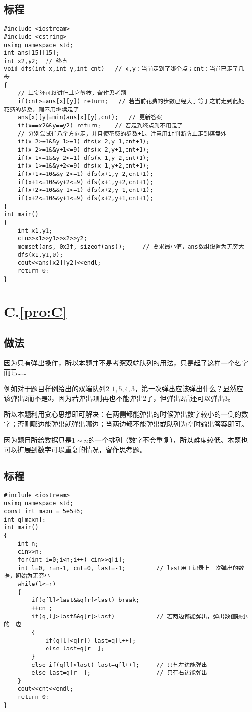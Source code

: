 \documentclass[
	lang=cn,
	color=blue
]{elegantbook}
\newcommand{\solutionheader}[1]{
	\chapter*{#1.\quad \ref*{pro:#1}}
	\addcontentsline{toc}{chapter}{A.\ref*{pro:#1}}
}
\begin{document}
\section*{标程}
\begin{lstlisting}
#include <iostream>
#include <cstring>
using namespace std;
int ans[15][15];
int x2,y2;  // 终点
void dfs(int x,int y,int cnt)   // x,y：当前走到了哪个点；cnt：当前已走了几步
{
    // 其实还可以进行其它剪枝，留作思考题
    if(cnt>=ans[x][y]) return;   // 若当前花费的步数已经大于等于之前走到此处花费的步数，则不用继续走了
    ans[x][y]=min(ans[x][y],cnt);   // 更新答案
    if(x==x2&&y==y2) return;    // 若走到终点则不用走了
    // 分别尝试往八个方向走，并且使花费的步数+1。注意用if判断防止走到棋盘外
    if(x-2>=1&&y-1>=1) dfs(x-2,y-1,cnt+1);
    if(x-2>=1&&y+1<=9) dfs(x-2,y+1,cnt+1);
    if(x-1>=1&&y-2>=1) dfs(x-1,y-2,cnt+1);
    if(x-1>=1&&y+2<=9) dfs(x-1,y+2,cnt+1);
    if(x+1<=10&&y-2>=1) dfs(x+1,y-2,cnt+1);
    if(x+1<=10&&y+2<=9) dfs(x+1,y+2,cnt+1);
    if(x+2<=10&&y-1>=1) dfs(x+2,y-1,cnt+1);
    if(x+2<=10&&y+1<=9) dfs(x+2,y+1,cnt+1);
}
int main()
{
    int x1,y1;
    cin>>x1>>y1>>x2>>y2;
    memset(ans, 0x3f, sizeof(ans));     // 要求最小值，ans数组设置为无穷大
    dfs(x1,y1,0);
    cout<<ans[x2][y2]<<endl;
    return 0;
}
\end{lstlisting}

\solutionheader{C}
\section*{做法}
因为只有弹出操作，所以本题并不是考察双端队列的用法，只是起了这样一个名字而已……

例如对于题目样例给出的双端队列$2,1,5,4,3$，第一次弹出应该弹出什么？显然应该弹出$2$而不是$3$，因为若弹出3则再也不能弹出$2$了，但弹出$2$后还可以弹出$3$。

所以本题利用贪心思想即可解决：在两侧都能弹出的时候弹出数字较小的一侧的数字；否则哪边能弹出就弹出哪边；当两边都不能弹出或队列为空时输出答案即可。

因为题目所给数据只是$1 \sim n$的一个排列（数字不会重复），所以难度较低。本题也可以扩展到数字可以重复的情况，留作思考题。

\section*{标程}
\begin{lstlisting}
#include <iostream>
using namespace std;
const int maxn = 5e5+5;
int q[maxn];
int main()
{
    int n;
    cin>>n;
    for(int i=0;i<n;i++) cin>>q[i];
    int l=0, r=n-1, cnt=0, last=-1;         // last用于记录上一次弹出的数据，初始为无穷小
    while(l<=r)
    {
        if(q[l]<last&&q[r]<last) break;
        ++cnt;
        if(q[l]>last&&q[r]>last)            // 若两边都能弹出，弹出数值较小的一边
        {
            if(q[l]<q[r]) last=q[l++];
            else last=q[r--];
        }
        else if(q[l]>last) last=q[l++];     // 只有左边能弹出
        else last=q[r--];                   // 只有右边能弹出
    }
    cout<<cnt<<endl;
    return 0;
}
\end{lstlisting}
\end{document}
